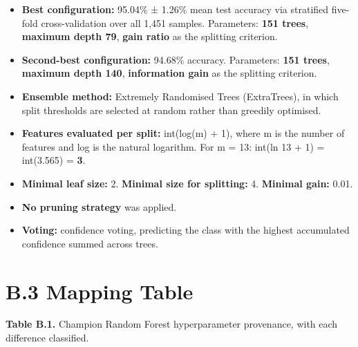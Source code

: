 \begin{itemize}
\tightlist
\item
  \textbf{Best configuration:} 95.04\% ± 1.26\% mean test accuracy via stratified five-fold cross-validation over all 1,451 samples. Parameters: \textbf{151 trees}, \textbf{maximum depth 79}, \textbf{gain ratio} as the splitting criterion.
\item
  \textbf{Second-best configuration:} 94.68\% accuracy. Parameters: \textbf{151 trees}, \textbf{maximum depth 140}, \textbf{information gain} as the splitting criterion.
\item
  \textbf{Ensemble method:} Extremely Randomised Trees (ExtraTrees), in which split thresholds are selected at random rather than greedily optimised.
\item
  \textbf{Features evaluated per split:} int(log(m) + 1), where m is the number of features and log is the natural logarithm. For m = 13: int(ln 13 + 1) = int(3.565) = \textbf{3}.
\item
  \textbf{Minimal leaf size:} 2. \textbf{Minimal size for splitting:} 4. \textbf{Minimal gain:} 0.01.
\item
  \textbf{No pruning strategy} was applied.
\item
  \textbf{Voting:} confidence voting, predicting the class with the highest accumulated confidence summed across trees.
\end{itemize}

\hypertarget{b.3-mapping-table}{%
\section{B.3 Mapping Table}\label{b.3-mapping-table}}

\textbf{Table B.1.} Champion Random Forest hyperparameter provenance, with each difference classified.

